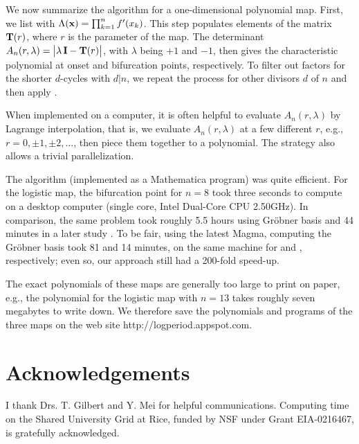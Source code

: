 \documentclass[preprint]{revtex4-1}
\begin{document}
We now summarize the algorithm for a one-dimensional polynomial map.
%
First, we list   with $\Lambda(\mathbf{x}) = \prod_{k=1}^n f'(x_k)$.
This step populates elements of the matrix $\mathbf{T}(r)$,
where $r$ is the parameter of the map.
%
The determinant $A_n(r, \lambda) = \big|\lambda \, \mathbf{I} - \mathbf{T}(r)\big|$,
with $\lambda$ being $+1$ and $-1$, then gives the characteristic
polynomial at onset and bifurcation points, respectively.
%
To filter out factors for the shorter $d$-cycles with $d|n$,
  we repeat the process for other divisors $d$ of $n$
  and then apply .
%


When implemented on a computer,
it is often helpful to evaluate $A_n(r,\lambda)$ by Lagrange interpolation,
that is, we evaluate $A_n(r, \lambda)$ at a few different $r$,
e.g., $r = 0, \pm1, \pm2,\ldots$, then piece them together
to a polynomial.
The strategy also allows a trivial parallelization.



The algorithm (implemented as a Mathematica program)
was quite efficient.
%
For the logistic map, the bifurcation point for $n = 8$
took three seconds to compute on a desktop computer
(single core, Intel\textsuperscript{\textregistered} Dual-Core CPU 2.50GHz).
%
In comparison,
  the same problem took roughly 5.5 hours \cite{kk1}
  using Gr\"obner basis
  and 44 minutes in a later study \cite{lewis}.
To be fair, using the latest Magma, computing the Gr\"obner basis
  took 81 and 14 minutes, on the same machine
  for  and , respectively;
even so, our approach still had a 200-fold speed-up.




%
The exact polynomials of these maps are generally too large to print on paper,
  e.g., the polynomial for the logistic map with $n = 13$
    takes roughly seven megabytes to write down.
%
We therefore save the polynomials and programs of the three maps on the web site
http://logperiod.appspot.com.




\section*{Acknowledgements}

I thank Drs. T. Gilbert and Y. Mei for helpful communications.
Computing time on the Shared University Grid at Rice,
funded by NSF under Grant EIA-0216467, is gratefully acknowledged.
\end{document}
